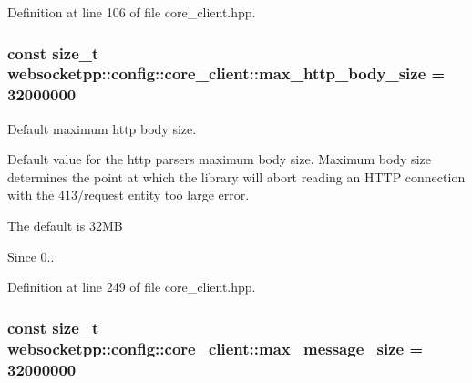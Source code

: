 Definition at line 106 of file core\+\_\+client.\+hpp.

\hypertarget{structwebsocketpp_1_1config_1_1core__client_a4b68db9b245ec097555f7e99842d96b3}{}
\subsubsection[{max\+\_\+http\+\_\+body\+\_\+size}]{\setlength{\rightskip}{0pt plus 5cm}const size\+\_\+t websocketpp\+::config\+::core\+\_\+client\+::max\+\_\+http\+\_\+body\+\_\+size = 32000000\hspace{0.3cm}{\ttfamily [static]}}\label{structwebsocketpp_1_1config_1_1core__client_a4b68db9b245ec097555f7e99842d96b3}


Default maximum http body size. 

Default value for the http parser\textquotesingle{}s maximum body size. Maximum body size determines the point at which the library will abort reading an H\+T\+T\+P connection with the 413/request entity too large error.

The default is 32\+M\+B

\begin{DoxySince}{Since}
0.. 
\end{DoxySince}


Definition at line 249 of file core\+\_\+client.\+hpp.

\hypertarget{structwebsocketpp_1_1config_1_1core__client_a84c86d78867a89e10d24866deb931807}{}
\subsubsection[{max\+\_\+message\+\_\+size}]{\setlength{\rightskip}{0pt plus 5cm}const size\+\_\+t websocketpp\+::config\+::core\+\_\+client\+::max\+\_\+message\+\_\+size = 32000000\hspace{0.3cm}{\ttfamily [static]}}\label{structwebsocketpp_1_1config_1_1core__client_a84c86d78867a89e10d24866deb931807}



